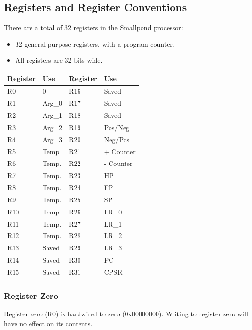 \documentclass[12pt]{article}
\begin{document}
   \subsection{Registers and Register Conventions}
   
   There are a total of 32 registers in the Smallpond processor:
   \begin{itemize}
       \item 32 general purpose registers, with a program counter.
       \item  All registers are 32 bits wide.
   \end{itemize}
   
   \begin{center}
   \begin{tabular}{|p{1.6cm}|p{2cm}||p{1.6cm}|p{2cm}|}
        \hline
        \textbf{Register} & \textbf{Use} & \textbf{Register} & \textbf{Use}\\
        \hline
        R0 & 0 & R16 & Saved\\
        \hline
        R1 & Arg\_0 & R17 &Saved\\
        \hline
        R2 & Arg\_1 & R18 &Saved\\
        \hline
        R3 & Arg\_2 & R19 &Pos/Neg\\
        \hline
        R4 & Arg\_3 & R20 &Neg/Pos\\
        \hline
        R5 & Temp & R21 &+ Counter\\
        \hline
        R6 & Temp. & R22 &- Counter\\
        \hline
        R7 & Temp. & R23 &HP\\
        \hline
        R8 & Temp. & R24 &FP\\
        \hline
        R9 & Temp. & R25 &SP\\
        \hline
        R10 & Temp. & R26 &LR\_0\\
        \hline
        R11 & Temp. & R27 &LR\_1\\
        \hline
        R12 & Temp. & R28 &LR\_2\\
        \hline
        R13 & Saved & R29 &LR\_3\\
        \hline
        R14 & Saved & R30 & PC\\
        \hline
        R15 & Saved & R31 & CPSR\\
        \hline
   \end{tabular}
   \end{center}
    
    \subsubsection{Register Zero}
        Register zero (R0) is hardwired to zero (0x00000000). Writing to register zero will have no effect on its contents.
        
\end{document}
